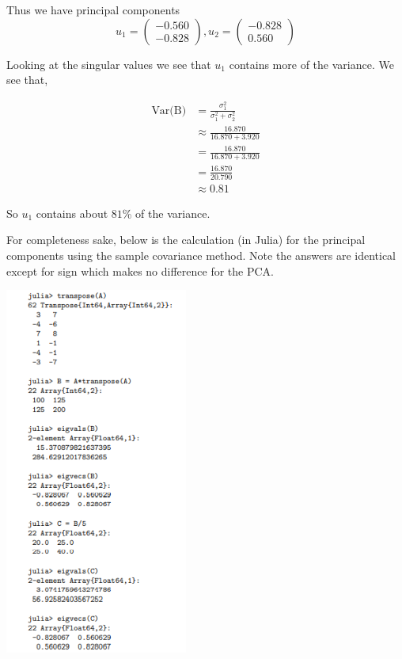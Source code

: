 \documentclass{article}
\begin{document}
Thus we have principal components
$$u_1=\begin{pmatrix}
-0.560\\
-0.828\end{pmatrix},u_2=\begin{pmatrix}
-0.828\\
0.560\end{pmatrix}$$

Looking at the singular values we see that $u_1$ contains more of the variance. We see that,

\begin{align}
\text{Var(B)}&=\frac{\sigma^2_1}{\sigma^2_1+\sigma^2_2}\\
&\approx\frac{16.870}{16.870+3.920}\\
&=\frac{16.870}{16.870+3.920}\\
&=\frac{16.870}{20.790}\\
&\approx 0.81
\end{align}

So $u_1$ contains about $81$\% of the variance.

For completeness sake, below is the calculation (in Julia) for the principal components using the sample covariance method. Note the answers are identical except for sign which makes no difference for the PCA.
\bigskip

\begin{center}
\includegraphics[width=6cm]{(19).png}
\end{center}
\end{document}
